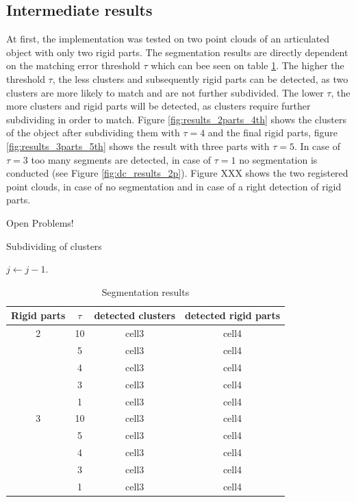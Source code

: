 \documentclass[notitlepage,english]{hgbreport}
\begin{document}
\subsection{Intermediate results}

At first, the implementation was tested on two point clouds of an articulated object with only two rigid parts. The segmentation results are directly dependent on the matching error threshold $\tau$ which can bee seen on table \ref{table:segmentation_results}. The higher the threshold $\tau$, the less clusters and subsequently rigid parts can be detected, as two clusters are more likely to match and are not further subdivided. The lower $\tau$, the more clusters and rigid parts will be detected, as clusters require further subdividing in order to match. Figure \ref{fig:results_2parts_4th} shows the clusters of the object after subdividing them with $\tau = 4$ and the final rigid parts, figure \ref{fig:results_3parts_5th} shows the result with three parts with $\tau = 5$. In case of $\tau = 3$ too many segments are detected, in case of $\tau = 1$ no segmentation is conducted (see Figure \ref{fig:dc_results_2p}). Figure XXX shows the two registered point clouds, in case of no segmentation and in case of a right detection of rigid parts.

Open Problems!

\begin{algorithm}
	\caption{Subdividing of clusters}\label{subdividing}
	\begin{algorithmic}[1]
		\State $j \gets j-1$.
		\EndProcedure
	\end{algorithmic}
\end{algorithm}

\begin{table}
	\centering\small
	\begin{tabular}{ |c|c|c|c| } 
		\hline
		Rigid parts & $\tau$ & detected clusters & detected rigid parts \\
		\hline
		2 & 10 & cell3 & cell4 \\ 
		& 5 & cell3 & cell4 \\
		& 4 & cell3 & cell4 \\
		& 3 & cell3 & cell4 \\
		& 1 & cell3 & cell4 \\
		\hline
		3 & 10 & cell3 & cell4 \\ 
		& 5 & cell3 & cell4 \\
		& 4 & cell3 & cell4 \\
		& 3 & cell3 & cell4 \\
		& 1 & cell3 & cell4 \\
		\hline
	\end{tabular}
	\caption{Segmentation results}
	\label{table:segmentation_results}
\end{table}
\end{document}
